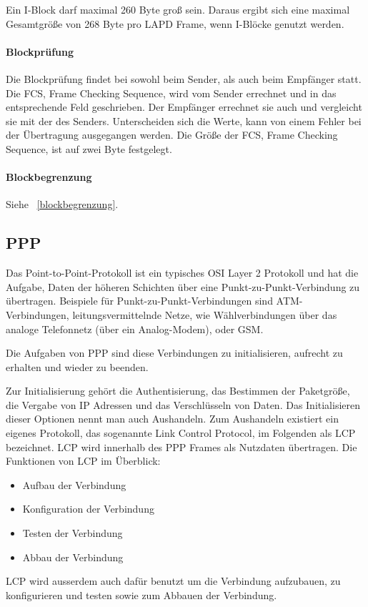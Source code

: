 \documentclass[12pt, a4paper, ngerman]{article}
\newcommand{\fcs}{FCS, Frame Checking Sequence,\xspace}
\begin{document}
Ein I-Block darf maximal 260 Byte groß sein. Daraus ergibt sich eine maximal Gesamtgröße von 268 Byte pro LAPD Frame, wenn I-Blöcke genutzt werden.

\paragraph{Blockprüfung}
Die Blockprüfung findet bei sowohl beim Sender, als auch beim Empfänger statt. Die \fcs wird vom Sender errechnet und in das entsprechende Feld geschrieben. Der Empfänger errechnet sie auch und vergleicht sie mit der des Senders. Unterscheiden sich die Werte, kann von einem Fehler bei der Übertragung ausgegangen werden. Die Größe der \fcs ist auf zwei Byte festgelegt.
 
\paragraph{Blockbegrenzung}
Siehe ~\ref{blockbegrenzung}.
 
\subsection{PPP}

Das Point-to-Point-Protokoll ist ein typisches OSI Layer 2 Protokoll und hat die Aufgabe, Daten der höheren Schichten über eine Punkt-zu-Punkt-Verbindung zu übertragen. Beispiele für Punkt-zu-Punkt-Verbindungen sind ATM-Verbindungen, leitungsvermittelnde Netze, wie Wählverbindungen über das analoge Telefonnetz (über ein Analog-Modem), oder GSM.

Die Aufgaben von PPP sind diese Verbindungen zu initialisieren, aufrecht zu erhalten und wieder zu beenden.

Zur Initialisierung gehört die Authentisierung, das Bestimmen der Paketgröße, die Vergabe von IP Adressen und das Verschlüsseln von Daten.  
Das Initialisieren dieser Optionen nennt man auch Aushandeln. Zum Aushandeln existiert ein eigenes Protokoll, das sogenannte Link Control Protocol, im Folgenden als LCP bezeichnet. LCP wird innerhalb des PPP Frames als Nutzdaten übertragen.
Die Funktionen von LCP im Überblick:
\begin{itemize}
	\item Aufbau der Verbindung
	\item Konfiguration der Verbindung
	\item Testen der Verbindung
	\item Abbau der Verbindung
\end{itemize}
LCP wird ausserdem auch dafür benutzt um die Verbindung aufzubauen, zu konfigurieren und testen sowie zum Abbauen der Verbindung. 
\end{document}
